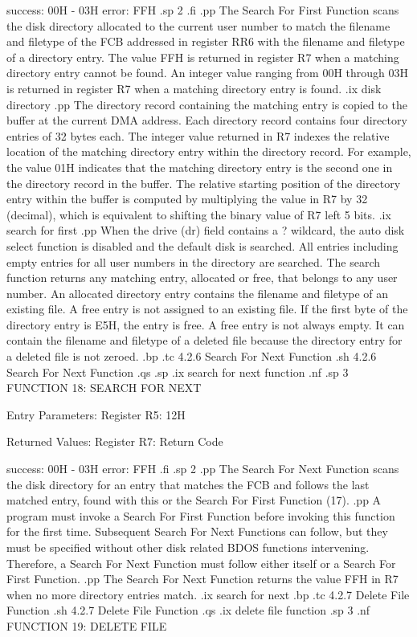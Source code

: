                                 success:  00H - 03H
                                  error:  FFH
.sp 2
.fi
.pp
The Search For First Function scans the disk directory allocated
to the current user number to match the filename and filetype of
the FCB addressed in register  RR6 with the filename and filetype
of a directory entry. The value FFH is returned in register   R7
when a matching directory entry cannot be found. An
integer value ranging from 00H through 03H is returned in
register   R7 when a matching directory entry is found. 
.ix disk directory
.pp
The directory record containing the matching entry is copied to
the buffer at the current DMA address. Each directory record
contains four directory entries of 32 bytes each. The integer value returned in
  R7 indexes the relative location of the matching directory
entry within the directory record. For example, the value 01H
indicates that the matching directory entry is the second one in the directory
record in the buffer. The relative starting position of the directory
entry within the buffer is computed by multiplying the value
in   R7 by 32 (decimal), which is equivalent to shifting the
binary value of   R7 left 5 bits. 
.ix search for first
.pp
When the drive (dr) field contains a ? wildcard, the auto disk
select function is disabled and the default disk is searched. All
entries including empty entries for all user numbers in the
directory are searched.  The search function returns any matching
entry, allocated or free, that belongs to any user number.  An
allocated directory entry contains the filename and filetype of
an existing file.  A free entry is not assigned to an existing
file. If the first byte of the directory entry is E5H, the entry
is free.  A free entry is not always empty. It can contain the
filename and filetype of a deleted file because the directory
entry for a deleted file is not zeroed. 
.bp
.tc         4.2.6  Search For Next Function
.sh
4.2.6  Search For Next Function
.qs
.sp
.ix search for next function
.nf
.sp 3
                 FUNCTION 18:  SEARCH FOR NEXT

             Entry Parameters:
                Register   R5:  12H

             Returned  Values:
                Register   R7:  Return Code

                                success:  00H - 03H
                                  error:  FFH
.fi            
.sp 2
.pp
The Search For Next Function scans the disk directory for an
entry that matches the FCB and follows the last matched entry, found 
with this or the Search For First Function (17). 
.pp
A program must invoke a Search For First Function before invoking
this function for the first time. Subsequent Search For Next
Functions can follow, but they must be specified 
without other disk related BDOS functions intervening. Therefore,
a Search For Next Function must follow either itself or a Search
For First Function. 
.pp
The Search For Next 
Function returns the 
value FFH in   R7 when no more directory entries match.  
.ix search for next
.bp
.tc         4.2.7  Delete File Function
.sh
4.2.7  Delete File Function
.qs
.ix delete file function
.sp 3
.nf
                   FUNCTION 19:  DELETE FILE

